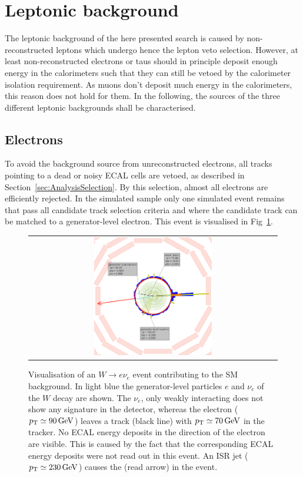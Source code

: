 \section{Leptonic background}
\label{sec:LeptonicBkg}

The leptonic background of the here presented search is caused by non-reconstructed leptons which undergo hence the lepton veto selection.
However, at least non-reconstructed electrons or taus should in principle deposit enough energy in the calorimeters such that they can still be vetoed by the calorimeter isolation requirement.
As muons don't deposit much energy in the calorimeters, this reason does not hold for them.
In the following, the sources of the three different leptonic backgrounds shall be characterised.

\subsection*{Electrons}
To avoid the background source from unreconstructed electrons, all tracks pointing to a dead or noisy ECAL cells are vetoed, as described in Section~\ref{sec:AnalysisSelection}.
By this selection, almost all electrons are efficiently rejected.
In the simulated \WJets sample only one simulated event remains that pass all candidate track selection criteria and where the candidate track can be matched to a generator-level electron.
This event is visualised in Fig~\ref{fig:LostElectron}. 
\begin{figure}[!tb]
  \centering 
  \begin{tabular}{c}
    \includegraphics[width=0.49\textwidth]{figures/analysis/Electron_lumi_279317_event_111637553.png}
  \end{tabular}
  \caption{Visualisation of an $W\rightarrow e\nu_e$ event contributing to the SM background. 
           In light blue the generator-level particles $e$ and $\nu_e$ of the $W$ decay are shown. 
           The $\nu_e$, only weakly interacting does not show any signature in the detector, whereas the electron ($p_{\text{T}}\simeq 90\,\text{Ge}\kern-0.06667em\text{V}$) leaves a track (black line) with \mbox{$p_{\text{T}}\simeq 70\,\text{Ge}\kern-0.06667em\text{V}$} in the tracker. 
           No ECAL energy deposits in the direction of the electron are visible. 
           This is caused by the fact that the corresponding ECAL energy deposits were not read out in this event.
           An ISR jet ($p_{\text{T}}\simeq 230\,\text{Ge}\kern-0.06667em\text{V}$) causes the \met (read arrow) in the event. }
  \label{fig:LostElectron}
\end{figure}
